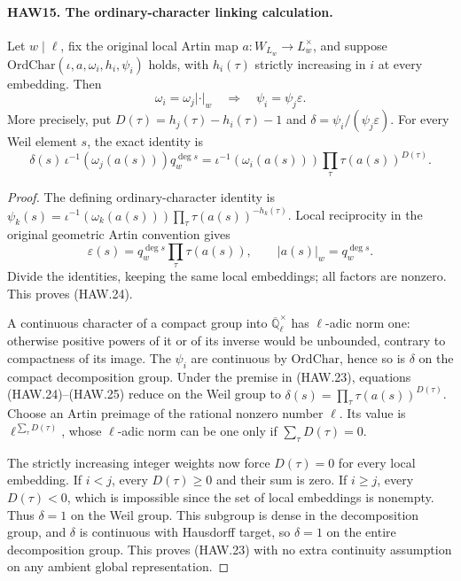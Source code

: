 \documentclass[11pt,a4paper]{article}
\numberwithin{equation}{section}
\theoremstyle{remark}\newtheorem{remark}[theorem]{Remark}
\begin{document}
\paragraph{HAW15. The ordinary-character linking calculation.}
\label{claim:HAW15}
Let $w\mid\ell$, fix the original local Artin map
$a:W_{L_w}\to L_w^\times$, and suppose
$\mathrm{OrdChar}(\iota,a,\omega_i,h_i,\psi_i)$ holds,
with $h_i(\tau)$ strictly increasing in $i$ at every
embedding.  Then
\[
          \omega_i=\omega_j|\cdot|_w
                      \quad\Longrightarrow\quad
                         \psi_i=\psi_j\varepsilon.
 \tag{HAW.23}
\]
More precisely, put
$D(\tau)=h_j(\tau)-h_i(\tau)-1$ and
$\delta=\psi_i/(\psi_j\varepsilon)$.  For every Weil
element $s$, the exact identity is
\[
 \delta(s)\,\iota^{-1}(\omega_j(a(s)))q_w^{\deg s}
       =\iota^{-1}(\omega_i(a(s)))
                           \prod_\tau\tau(a(s))^{D(\tau)}.
 \tag{HAW.24}
\]
\begin{proof}
The defining ordinary-character identity is
$\psi_k(s)=\iota^{-1}(\omega_k(a(s)))
\prod_\tau\tau(a(s))^{-h_k(\tau)}$.
Local reciprocity in the original geometric Artin convention
gives
\[
 \varepsilon(s)=q_w^{\deg s}\prod_\tau\tau(a(s)),\qquad
 |a(s)|_w=q_w^{\deg s}.
 \tag{HAW.25}
\]
Divide the identities, keeping the same local embeddings;
all factors are nonzero.  This proves (HAW.24).

A continuous character of a compact group into
$\overline{\mathbb Q}_\ell^\times$ has $\ell$-adic norm
one: otherwise positive powers of it or of its inverse
would be unbounded, contrary to compactness of its image.
The $\psi_i$ are continuous by $\mathrm{OrdChar}$, hence
so is $\delta$ on the compact decomposition group.
Under the premise in (HAW.23), equations (HAW.24)--(HAW.25)
reduce on the Weil group to
$\delta(s)=\prod_\tau\tau(a(s))^{D(\tau)}$.
Choose an Artin preimage of the rational nonzero number
$\ell$.  Its value is $\ell^{\sum_\tau D(\tau)}$,
whose $\ell$-adic norm can be one only if
$\sum_\tau D(\tau)=0$.

The strictly increasing integer weights now force
$D(\tau)=0$ for every local embedding.  If $i<j$, every
$D(\tau)\ge0$ and their sum is zero.  If $i\ge j$,
every $D(\tau)<0$, which is impossible since the set of
local embeddings is nonempty.  Thus $\delta=1$ on the
Weil group.  This subgroup is dense in the decomposition
group, and $\delta$ is continuous with Hausdorff target,
so $\delta=1$ on the entire decomposition group.  This
proves (HAW.23) with no extra continuity assumption on
any ambient global representation.
\end{proof}
\end{document}
